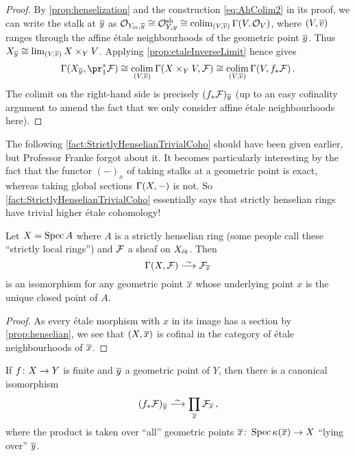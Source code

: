 \begin{proof}
	By \cref{prop:henselization} and the construction \cref{eq:AhColim2} in its proof, we can write the stalk at $\ov{y}$ as $\Oo_{Y_\et,\ov{y}}\cong \Oo_{Y,y}^\sh\cong \colimit_{(V,\ov{v})}\Global(V,\Oo_V)$, where $(V,\ov{v})$ ranges through the affine étale neighbourhoods of the geometric point $\ov{y}$. Thus $X_{\ov{y}}\cong \limit_{(V,\ov{v})}X\times_YV$. Applying \cref{prop:etaleInverseLimit} hence gives
	\begin{equation*}
		\Global(X_{\ov{y}},\pr_1^*\Ff)\cong \colimit_{(V,\ov{v})}\Global(X\times_YV,\Ff)\cong \colimit_{(V,\ov{v})}\Global(V,f_*\Ff)\,.
	\end{equation*}
	The colimit on the right-hand side is precisely $(f_*\Ff)_{\ov{y}}$ (up to an easy cofinality argument to amend the fact that we only consider affine étale neighbourhoods here).
\end{proof}
The following \cref{fact:StrictlyHenselianTrivialCoho} should have been given earlier, but Professor Franke forgot about it. It becomes particularly interesting by the fact that the functor $(-)_x$ of taking stalks at a geometric point is exact, whereas taking global sections $\operatorname{\Gamma}(X,-)$ is not. So \cref{fact:StrictlyHenselianTrivialCoho} essentially says that strictly henselian rings have trivial higher étale cohomology!
\begin{fact}\label{fact:StrictlyHenselianTrivialCoho}
	Let $X=\operatorname{Spec} A$ where $A$ is a strictly henselian ring (some people call these \enquote{strictly local rings}) and $\mathcal{F}$ a sheaf on $X_{\mathrm{\acute{e}t}}$. Then
	\begin{equation*}
		\Global(X,\Ff)\isomorphism \Ff_{\ov{x}}
	\end{equation*}
	is an isomorphism for any geometric point $\ov{x}$ whose underlying point $x$ is the unique closed point of $A$.
\end{fact}
\begin{proof}
	As every étale morphism with $x$ in its image has a section by \cref{prop:henselian}, we see that $(X,\ov{x})$ is cofinal in the category of étale neighbourhoods of $\ov{x}$.
\end{proof}
\begin{cor}\label{cor:finiteStalks}
	If $f\colon X\morphism Y$ is finite and $\ov{y}$ a geometric point of $Y$, then there is a canonical isomorphism
	\begin{equation*}
		(f_*\Ff)_{\ov{y}}\isomorphism\prod_{\ov{x}}\Ff_{\ov{x}}\,,
	\end{equation*}
	where the product is taken over \enquote{all} geometric points $\ov{x}\colon \Spec \kappa(\ov{x})\morphism X$ \enquote{lying over} $\ov{y}$.
\end{cor}
